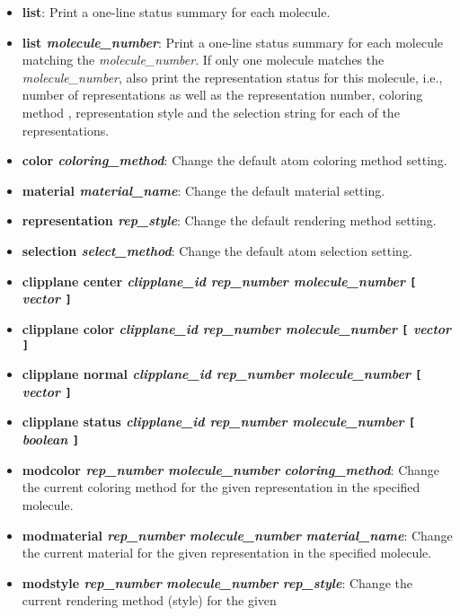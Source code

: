 \begin{itemize}
    \item {\bf  list}: Print a one-line status summary for each molecule.
    \item {\bf  list {\it molecule\_number}}: Print a one-line status summary
for each molecule matching the {\it molecule\_number}. If only one 
molecule matches the {\it molecule\_number}, also print the representation
status for this molecule, i.e., number of representations as well as
the representation number, coloring method
, representation style
and the selection string for each of the representations.
    \item {\bf  color {\it coloring\_method}}: Change the default atom coloring method  setting.
    \item {\bf  material {\it material\_name}}: Change the default material setting.
    \item {\bf  representation {\it rep\_style}}: Change the default rendering
method setting.
    \item {\bf  selection {\it select\_method}}: Change the default atom selection  setting.
    \item {\bf  clipplane center {\it clipplane\_id rep\_number molecule\_number } {\tt [} {\it vector} {\tt ]}}
    \item {\bf  clipplane color {\it clipplane\_id rep\_number molecule\_number } {\tt [} {\it  vector} {\tt ]}}
    \item {\bf  clipplane normal {\it clipplane\_id rep\_number molecule\_number } {\tt [} {\it vector} {\tt ]}}
    \item {\bf  clipplane status {\it clipplane\_id rep\_number molecule\_number } {\tt [} {\it boolean} {\tt ]}}
    \item {\bf  modcolor {\it rep\_number} {\it molecule\_number} {\it coloring\_method}}: 
Change the current coloring method for the given
representation in the specified molecule.
    \item {\bf  modmaterial {\it rep\_number} {\it molecule\_number} {\it material\_name}}:
Change the current material for the given representation in the specified 
molecule.
    \item {\bf  modstyle {\it rep\_number} {\it molecule\_number} {\it rep\_style}}: 
Change the current rendering method (style) for the given

\end{itemize}
